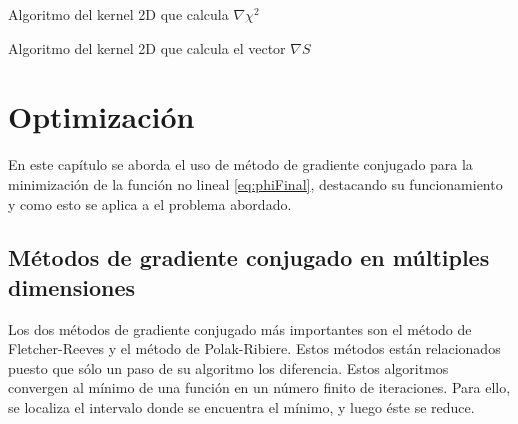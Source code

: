 \begin{algorithm}
	\begin{algorithmic}[1]
		\ENDFOR
	\end{algorithmic}
	\caption{Algoritmo del kernel 2D que calcula $\nabla \chi^{2}$}
	\label{alg:dchi2}
\end{algorithm}

\begin{algorithm}
	\begin{algorithmic}[1]
	\end{algorithmic}
	\caption{Algoritmo del kernel 2D que calcula el vector $\nabla S$}
	\label{alg:dS}
\end{algorithm}

\chapter{Optimización}
\label{cap:opti}

En este capítulo se aborda el uso de método de gradiente conjugado para la minimización de la función no lineal \ref{eq:phiFinal}, destacando su funcionamiento y como esto se aplica a el problema abordado.

\section{Métodos de gradiente conjugado en múltiples dimensiones}

Los dos métodos de gradiente conjugado más importantes son el método de Fletcher-Reeves y el método de Polak-Ribiere. Estos métodos están relacionados puesto que sólo un paso de su algoritmo los diferencia. Estos algoritmos convergen al mínimo de una función en un número finito de iteraciones. Para ello, se localiza el intervalo donde se encuentra el mínimo, y luego éste se reduce.

